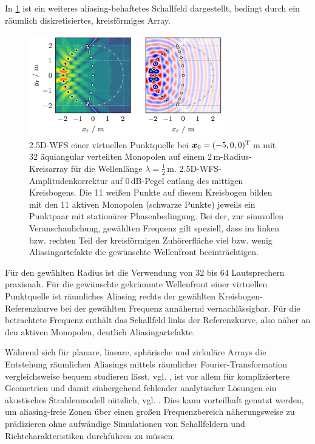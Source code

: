 In \Abb\ref{fig:wfs25d_circSSD_aliasing} ist ein weiteres aliasing-behaftetes
Schallfeld dargestellt, bedingt durch ein räumlich diskretisiertes,
kreisförmiges Array.
%
\begin{figure}[t]
\centering
\begin{plotfigures}
\includegraphics[width=85mm]{../python/wfs25d_circSSD_aliasing.png}
\end{plotfigures}
\caption{2.5D-WFS einer virtuellen Punktquelle bei $\bm{x}_\mathrm{0} = (-5,0,0)^\mathrm{T}$\,m
mit 32 äquiangular verteilten Monopolen auf einem 2\,m-Radius-Kreisarray
für die Wellenlänge $\lambda=\frac{1}{2}$\,m.
%
2.5D-WFS-Amplitudenkorrektur auf $0$\,dB-Pegel entlang des mittigen Kreisbogens.
%
Die 11 weißen Punkte auf diesem Kreisbogen bilden mit den 11 aktiven Monopolen
(schwarze Punkte) jeweils ein Punktpaar mit stationärer Phasenbedingung.
%
Bei der, zur sinnvollen Veranschaulichung, gewählten Frequenz gilt speziell, dass
im linken bzw. rechten Teil der kreisförmigen Zuhörerfläche viel bzw. wenig
Aliasingartefakte die gewünschte Wellenfront beeinträchtigen.
%
\cc
}
\label{fig:wfs25d_circSSD_aliasing}
\end{figure}
%
Für den gewählten Radius ist die Verwendung von 32 bis 64 Lautsprechern
praxisnah.
%
Für die gewünschte gekrümmte Wellenfront einer virtuellen Punktquelle
ist räumliches Aliasing rechts der gewählten Kreisbogen-Referenzkurve
bei der gewählten Frequenz annähernd vernachlässigbar.
%
Für die betrachtete Frequenz enthält das Schallfeld links der Referenzkurve,
also näher an den aktiven Monopolen, deutlich Aliasingartefakte.



Während sich für planare, lineare, sphärische und zirkuläre Arrays
die Entstehung räumlichen Aliasings mittels räumlicher Fourier-Transformation
vergleichsweise bequem studieren lässt,
vgl. \cite{Start1997_diss,Spors2008b,Ahrens2010_IEEE,Fazi2010,Schultz2016_diss},
ist vor allem für kompliziertere Geometrien und damit einhergehend fehlender
analytischer Lösungen ein akustisches Strahlenmodell
nützlich, vgl. \cite{Winter2019_diss}.
%
Dies kann vorteilhaft genutzt werden, um aliasing-freie Zonen über einen großen
Frequenzbereich näherungsweise zu prädizieren ohne aufwändige Simulationen von
Schallfeldern und Richtcharakteristiken durchführen zu müssen.



